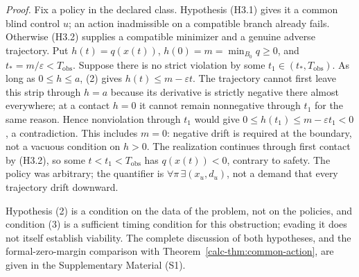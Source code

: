\documentclass[10pt,twocolumn]{article}
\theoremstyle{definition}
\begin{document}
\emph{Proof.} Fix a policy in the declared class. Hypothesis (H3.1)
gives it a common blind control \(u\); an action inadmissible on a
compatible branch already fails. Otherwise (H3.2) supplies a compatible
minimizer and a genuine adverse trajectory. Put
\(h(t)=q(x(t))\), \(h(0)=m=\min_{B_0}q\ge0\), and
\(t_*=m/\varepsilon<T_{\mathrm{obs}}\). Suppose there is no strict
violation by some \(t_1\in(t_*,T_{\mathrm{obs}})\). As long as
\(0\le h\le a\), (2) gives \(h(t)\le m-\varepsilon t\).
The trajectory cannot first leave this strip through \(h=a\) because
its derivative is strictly negative there almost everywhere; at a
contact \(h=0\) it cannot remain nonnegative through \(t_1\)
for the same reason. Hence nonviolation through \(t_1\) would give
\(0\le h(t_1)\le m-\varepsilon t_1<0\), a contradiction.
This includes \(m=0\): negative drift is required at the boundary,
not a vacuous condition on \(h>0\). The realization continues through
first contact by (H3.2), so some \(t<t_1<T_{\mathrm{obs}}\) has
\(q(x(t))<0\), contrary to safety. The policy was arbitrary; the
quantifier is \(\forall\pi\,\exists(x_u,d_u)\), not a demand that
every trajectory drift downward.

Hypothesis (2) is a condition on the data of the problem, not on the policies, and condition (3) is a sufficient timing condition for this obstruction; evading it does not itself establish viability. The complete discussion of both hypotheses, and the formal-zero-margin comparison with Theorem~\ref{calc-thm:common-action}, are given in the Supplementary Material (S1).
\end{document}
